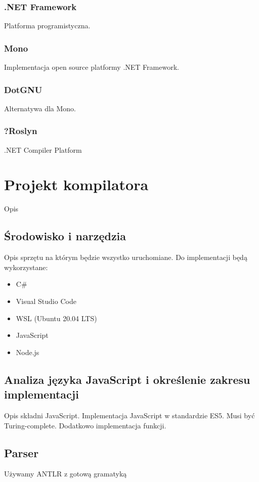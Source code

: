 \documentclass[a4paper]{article}
\begin{document}
\subsubsection{.NET Framework}
Platforma programistyczna.

\subsubsection{Mono}
Implementacja open source platformy .NET Framework.

\subsubsection{DotGNU}
Alternatywa dla Mono.

\subsubsection{?Roslyn}
.NET Compiler Platform


\section{Projekt kompilatora}
Opis 
\subsection{Środowisko i narzędzia}
Opis sprzętu na którym będzie wszystko uruchomiane.
Do implementacji będą wykorzystane:

\begin{itemize}
  \item C\#
  \item Visual Studio Code
  \item WSL (Ubuntu 20.04 LTS)
  \item JavaScript
  \item Node.js
\end{itemize}

\subsection{Analiza języka JavaScript i określenie zakresu implementacji}
Opis składni JavaScript.
Implementacja JavaScript w standardzie ES5.
Musi być Turing-complete. Dodatkowo implementacja funkcji.

\subsection{Parser}
Używamy ANTLR z gotową gramatyką
\end{document}

